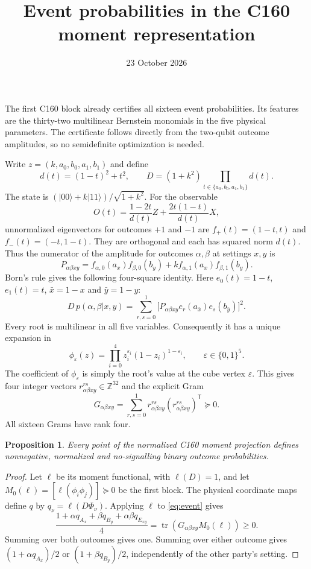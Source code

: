 \documentclass[11pt]{article}
\title{Event probabilities in the C160 moment representation}
\author{}
\date{23 October 2026}
\newtheorem{proposition}{Proposition}
\begin{document}
\maketitle

The first C160 block already certifies all sixteen event probabilities.
Its features are the thirty-two multilinear Bernstein monomials in the
five physical parameters. The certificate follows directly from the
two-qubit outcome amplitudes, so no semidefinite optimization is needed.

Write $z=(k,a_0,b_0,a_1,b_1)$ and define
\[
 d(t)=(1-t)^2+t^2,\qquad
 D=(1+k^2)\prod_{t\in\{a_0,b_0,a_1,b_1\}}d(t).
\]
The state is $(|00\rangle+k|11\rangle)/\sqrt{1+k^2}$.
For the observable
\[
 O(t)=\frac{1-2t}{d(t)}Z+\frac{2t(1-t)}{d(t)}X,
\]
unnormalized eigenvectors for outcomes $+1$ and $-1$ are
$f_+(t)=(1-t,t)$ and $f_-(t)=(-t,1-t)$.
They are orthogonal and each has squared norm $d(t)$.
Thus the numerator of the amplitude for outcomes $\alpha,\beta$
at settings $x,y$ is
\[
 P_{\alpha\beta xy}
 =f_{\alpha,0}(a_x)f_{\beta,0}(b_y)
   +k f_{\alpha,1}(a_x)f_{\beta,1}(b_y).
\]
Born's rule gives the following four-square identity. Here
$e_0(t)=1-t$, $e_1(t)=t$, $\bar x=1-x$ and $\bar y=1-y$:
\begin{equation}\label{eq:event}
 D\,p(\alpha,\beta|x,y)
 =\sum_{r,s=0}^1
 \bigl[P_{\alpha\beta xy}e_r(a_{\bar x})e_s(b_{\bar y})\bigr]^2.
\end{equation}
Every root is multilinear in all five variables. Consequently it has
a unique expansion in
\[
 \phi_\varepsilon(z)=\prod_{i=0}^4
 z_i^{\varepsilon_i}(1-z_i)^{1-\varepsilon_i},\qquad
 \varepsilon\in\{0,1\}^5.
\]
The coefficient of $\phi_\varepsilon$ is simply the root's value at
the cube vertex $\varepsilon$. This gives four integer vectors
$r_{\alpha\beta xy}^{rs}\in\mathbb Z^{32}$ and the explicit Gram
\[
 G_{\alpha\beta xy}
 =\sum_{r,s=0}^1r_{\alpha\beta xy}^{rs}
                  (r_{\alpha\beta xy}^{rs})^{\mathsf T}\succeq0.
\]
All sixteen Grams have rank four.

\begin{proposition}
Every point of the normalized C160 moment projection defines
nonnegative, normalized and no-signalling binary outcome probabilities.
\end{proposition}
\begin{proof}
Let $\ell$ be its moment functional, with $\ell(D)=1$, and let
$M_0(\ell)=[\ell(\phi_i\phi_j)]\succeq0$ be the first block.
The physical coordinate maps define $q$ by
$q_\nu=\ell(D\Phi_\nu)$. Applying $\ell$ to \eqref{eq:event} gives
\[
 \frac{1+\alpha q_{A_x}+\beta q_{B_y}
                  +\alpha\beta q_{E_{xy}}}{4}
 =\operatorname{tr}(G_{\alpha\beta xy}M_0(\ell))\ge0.
\]
Summing over both outcomes gives one. Summing over either outcome
gives $(1+\alpha q_{A_x})/2$ or $(1+\beta q_{B_y})/2$,
independently of the other party's setting.
\end{proof}
\end{document}
